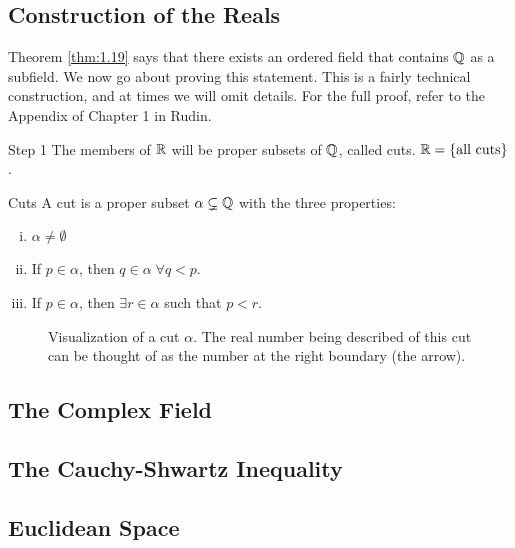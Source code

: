 \subsection{Construction of the Reals}
Theorem \ref{thm:1.19} says that there exists an ordered field that contains $\mathbb{Q}$ as a subfield. We now go about proving this statement. This is a fairly technical construction, and at times we will omit details. For the full proof, refer to the Appendix of Chapter 1 in Rudin.
\begin{nblank}{Step 1}
    The members of $\mathbb{R}$ will be proper subsets of $\mathbb{Q}$, called cuts. $\mathbb{R} = \set{\text{all cuts}}$. 
    \begin{ndef}{Cuts}
        A cut is a proper subset $\alpha \subsetneq \mathbb{Q}$ with the three properties:
        \begin{enumerate}[(i)]
            \item $\alpha \neq \emptyset$
            \item If $p \in \alpha$, then $q \in \alpha \; \forall q < p$. 
            \item If $p \in \alpha$, then $\exists r \in \alpha$ such that $p < r$. 
        \end{enumerate}
    \end{ndef}
\end{nblank}
\begin{figure}[htbp]
    \centering
    \caption{Visualization of a cut $\alpha$. The real number being described of this cut can be thought of as the number at the right boundary (the arrow).}
    \label{fig2} 
\end{figure}

\subsection{The Complex Field}

\subsection{The Cauchy-Shwartz Inequality}

\subsection{Euclidean Space}


